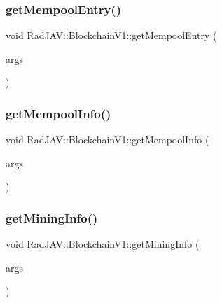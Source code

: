 \subsubsection{\texorpdfstring{get\+Mempool\+Entry()}{getMempoolEntry()}}
{\footnotesize\ttfamily void Rad\+J\+A\+V\+::\+Blockchain\+V1\+::get\+Mempool\+Entry (\begin{DoxyParamCaption}\item[{const v8\+::\+Function\+Callback\+Info$<$ v8\+::\+Value $>$ \&}]{args }\end{DoxyParamCaption})\hspace{0.3cm}{\ttfamily [static]}}

\mbox{\label{class_rad_j_a_v_1_1_blockchain_v1_affb050420ac0f9f8c767945f4b1db2e7}} 
\subsubsection{\texorpdfstring{get\+Mempool\+Info()}{getMempoolInfo()}}
{\footnotesize\ttfamily void Rad\+J\+A\+V\+::\+Blockchain\+V1\+::get\+Mempool\+Info (\begin{DoxyParamCaption}\item[{const v8\+::\+Function\+Callback\+Info$<$ v8\+::\+Value $>$ \&}]{args }\end{DoxyParamCaption})\hspace{0.3cm}{\ttfamily [static]}}

\mbox{\label{class_rad_j_a_v_1_1_blockchain_v1_a2325ad8a2a7a03545fb63a2c8a954367}} 
\subsubsection{\texorpdfstring{get\+Mining\+Info()}{getMiningInfo()}}
{\footnotesize\ttfamily void Rad\+J\+A\+V\+::\+Blockchain\+V1\+::get\+Mining\+Info (\begin{DoxyParamCaption}\item[{const v8\+::\+Function\+Callback\+Info$<$ v8\+::\+Value $>$ \&}]{args }\end{DoxyParamCaption})\hspace{0.3cm}{\ttfamily [static]}}

